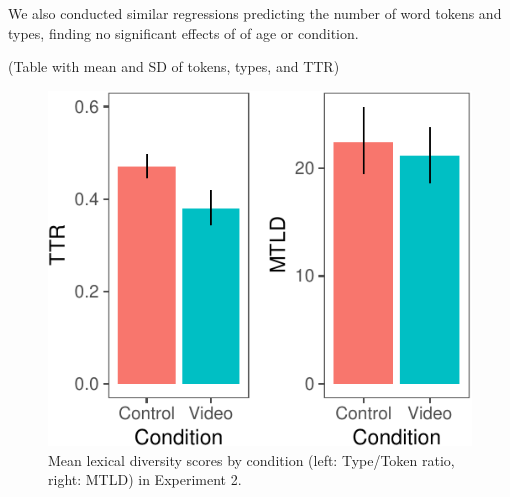 \documentclass[10pt, letterpaper]{article}
\newenvironment{CodeChunk}{}{}
\begin{document}
We also conducted similar regressions predicting the number of word
tokens and types, finding no significant effects of of age or condition.

(Table with mean and SD of tokens, types, and TTR)

\begin{CodeChunk}
\begin{figure}[H]

{\centering \includegraphics{figs/e2lexdiv-1} 

}

\caption[Mean lexical diversity scores by condition (left]{Mean lexical diversity scores by condition (left: Type/Token ratio, right: MTLD) in Experiment 2.}\label{fig:e2lexdiv}
\end{figure}
\end{CodeChunk}
\end{document}
